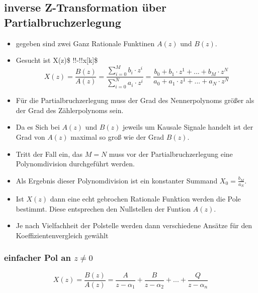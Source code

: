 \documentclass[11pt]{article}
\providecommand{\tightlist}{%
      \setlength{\itemsep}{0pt}\setlength{\parskip}{0pt}}
\begin{document}
    \subsection{inverse Z-Transformation über
Partialbruchzerlegung}\label{inverse-z-transformation-uxfcber-partialbruchzerlegung}

\begin{itemize}
\tightlist
\item
  gegeben sind zwei Ganz Rationale Funktinen \(A(z)\) und \(B(z)\).
\end{itemize}

    \begin{itemize}
\tightlist
\item
  Gesucht ist X(z)\$ \bullet !!-!!\circ x{[}k{]}\$
  \[X(z) = \frac{B(z)}{A(z)} = \frac {\sum_{i=0}^M b_i \cdot z^{i}} {\sum_{i=0}^N a_i \cdot z^{i}} = \frac{b_0 + b_1 \cdot z^1 + ... + b_M \cdot z^N}{a_0 + a_1 \cdot z^1 + ... + a_N \cdot z^N}\]
\end{itemize}

    \begin{itemize}
\item
  Für die Partialbruchzerlegung muss der Grad des Nennerpolynoms größer
  als der Grad des Zählerpolynoms sein.
\item
  Da es Sich bei \(A(z)\) und \(B(z)\) jeweils um Kausale Signale
  handelt ist der Grad von \(A(z)\) maximal so groß wie der Grad
  \(B(z)\).
\item
  Tritt der Fall ein, das \(M = N\) muss vor der Partialbruchzerlegung
  eine Polynomdivision durchgeführt werden.
\item
  Als Ergebnis dieser Polynomdivision ist ein konstanter Summand
  \(X_0 = \frac{b_M}{a_N}\).
\item
  Ist \(X(z)\) dann eine echt gebrochen Rationale Funktion werden die
  Pole bestimmt. Diese entsprechen den Nullstellen der Funtion \(A(z)\).
\item
  Je nach Vielfachheit der Polstelle werden dann verschiedene Ansätze
  für den Koeffizientenvergleich gewählt
\end{itemize}

    \subsubsection{\texorpdfstring{einfacher Pol an
\(z \neq 0\)}{einfacher Pol an z \textbackslash{}neq 0}}\label{einfacher-pol-an-z-neq-0}

\[ X(z) = \frac{B(z)}{A(z)} = \frac{A}{z-\alpha_1} + \frac{B}{z-\alpha_2} + ... + \frac{Q}{z-\alpha_n}\]
\end{document}
